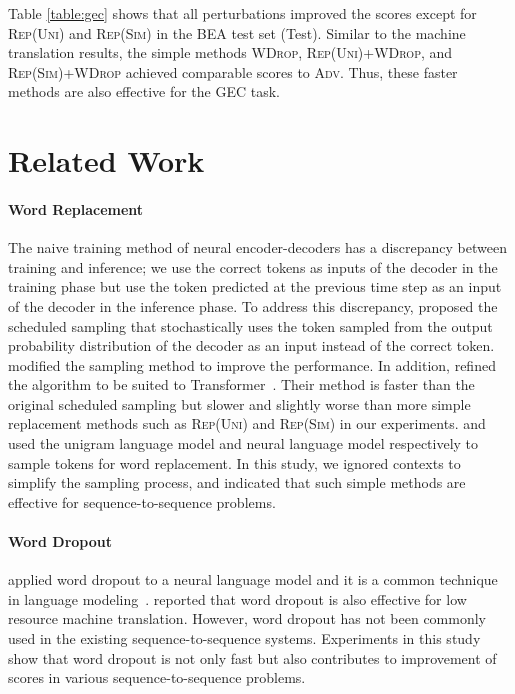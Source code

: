 \documentclass[11pt]{article}
\newcommand{\uniform}{\textsc{Rep(Uni)}}
\newcommand{\similarity}{\textsc{Rep(Sim)}}
\newcommand{\worddrop}{\textsc{WDrop}}
\newcommand{\adv}{\textsc{Adv}}
\begin{document}
Table \ref{table:gec} shows that all perturbations improved the scores except for \uniform{} and \similarity{} in the BEA test set (Test).
Similar to the machine translation results, the simple methods \worddrop{}, \uniform{}+\worddrop{}, and \similarity{}+\worddrop{} achieved comparable scores to \adv{}.
Thus, these faster methods are also effective for the GEC task.


\section{Related Work}
\paragraph{Word Replacement}
The naive training method of neural encoder-decoders has a discrepancy between training and inference; we use the correct tokens as inputs of the decoder in the training phase but use the token predicted at the previous time step as an input of the decoder in the inference phase.
To address this discrepancy,  proposed the scheduled sampling that stochastically uses the token sampled from the output probability distribution of the decoder as an input instead of the correct token.
 modified the sampling method to improve the performance.
In addition,  refined the algorithm to be suited to Transformer~\cite{NIPS2017_7181}.
Their method is faster than the original scheduled sampling but slower and slightly worse than more simple replacement methods such as \uniform{} and \similarity{} in our experiments.
 and  used the unigram language model and neural language model respectively to sample tokens for word replacement.
In this study, we ignored contexts to simplify the sampling process, and indicated that such simple methods are effective for sequence-to-sequence problems.


\paragraph{Word Dropout}
 applied word dropout to a neural language model and it is a common technique in language modeling~\cite{merityRegOpt,DBLP:journals/corr/abs-1711-03953,D18-1489}.
 reported that word dropout is also effective for low resource machine translation. 
However, word dropout has not been commonly used in the existing sequence-to-sequence systems.
Experiments in this study show that word dropout is not only fast but also contributes to improvement of scores in various sequence-to-sequence problems.
\end{document}
